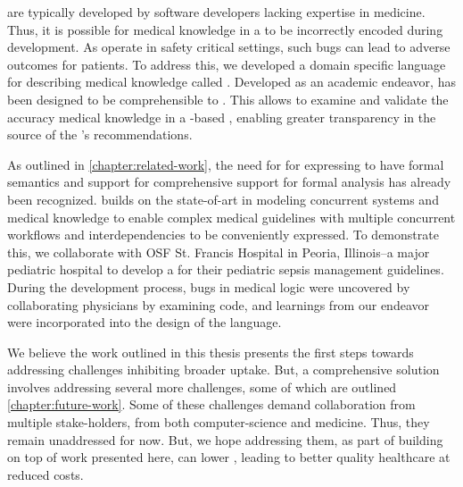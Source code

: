 \CDSSs{} are typically developed by software developers lacking expertise in
medicine. Thus, it is possible for medical knowledge in a \CDSS{} to be incorrectly
encoded during development. As \CDSSs{} operate in safety critical settings, such
bugs can lead to adverse outcomes for patients. To address this,
we developed a domain specific language for describing medical knowledge
called \MediK{}. Developed as an academic endeavor, \MediK{} has been designed to be
comprehensible to \HCPs{}. This allows \HCPs{} to examine and validate the accuracy
medical knowledge in a \MediK-based \CDSS{}, enabling greater transparency in
the source of the \CDSS{}'s recommendations.

As outlined in \autoref{chapter:related-work}, the need for \DSLs{} for
expressing \BPGs{} to have formal semantics and support for comprehensive
support for formal analysis has already been recognized. \MediK{} builds
on the state-of-art in modeling concurrent systems and medical knowledge
to enable complex medical guidelines with multiple concurrent workflows
and interdependencies to be conveniently expressed. To demonstrate this,
we collaborate with OSF St. Francis Hospital in Peoria, Illinois--a
major pediatric hospital to develop a \CDSS{} for their pediatric
sepsis management guidelines. During the development process, bugs in
medical logic were uncovered by collaborating physicians by examining
\MediK{} code, and learnings from our endeavor were incorporated into the
design of the language.

We believe the work outlined in this thesis presents the first steps towards
addressing challenges inhibiting broader \CDSS{} uptake. But, a comprehensive
solution involves addressing several more challenges, some of which are
outlined \autoref{chapter:future-work}. Some of these challenges demand
collaboration from multiple stake-holders, from both computer-science and
medicine. Thus, they remain unaddressed for now. But, we hope addressing
them, as part of building on top of work presented here, can lower \PMEs{},
leading to better quality healthcare at reduced costs.
